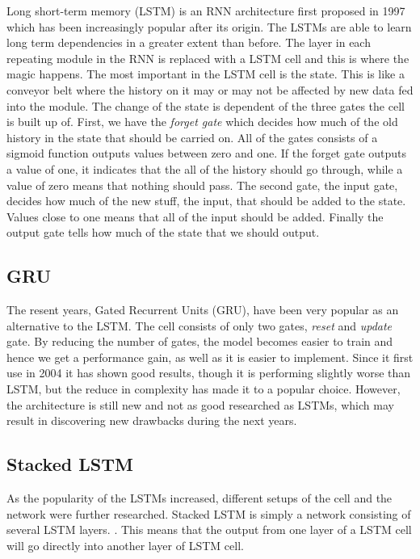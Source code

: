 \documentclass{article} %
\begin{document}
Long short-term memory (LSTM) is an RNN architecture first proposed in 1997 \cite{LSTM} which has been increasingly popular after its origin. The LSTMs are able to learn long term dependencies in a greater extent than before. The layer in each repeating module in the RNN is replaced with a LSTM cell and this is where the magic happens. The most important in the LSTM cell is the state. This is like a conveyor belt where the history on it may or may not be affected by new data fed into the module. The change of the state is dependent of the three gates the cell is built up of. First, we have the \textit{forget gate} which decides how much of the old history in the state that should be carried on. All of the gates consists of a sigmoid function outputs values between zero and one. If the forget gate outputs a value of one, it indicates that the all of the history should go through, while a value of zero means that nothing should pass. The second gate, the input gate, decides how much of the new stuff, the input, that should be added to the state. Values close to one means that all of the input should be added. Finally the output gate tells how much of the state that we should output.

\subsection{GRU}
The resent years, Gated Recurrent Units (GRU), have been very popular as an alternative to the LSTM. The cell consists of only two gates, \textit{reset} and \textit{update} gate. By reducing the number of gates, the model becomes easier to train and hence we get a performance gain, as well as it is easier to implement. Since it first use in 2004 \cite{Cho} it has shown good results, though it is performing slightly worse than LSTM, but the reduce in complexity has made it to a popular choice. However, the architecture is still new and not as good researched as LSTMs, which may result in discovering new drawbacks during the next years.

\subsection{Stacked LSTM}
As the popularity of the LSTMs increased, different setups of the cell and the network were further researched. Stacked LSTM is simply a network consisting of several LSTM layers. \cite{gridLSTM}. This means that the output from one layer of a LSTM cell will go directly into another layer of LSTM cell.
\end{document}
